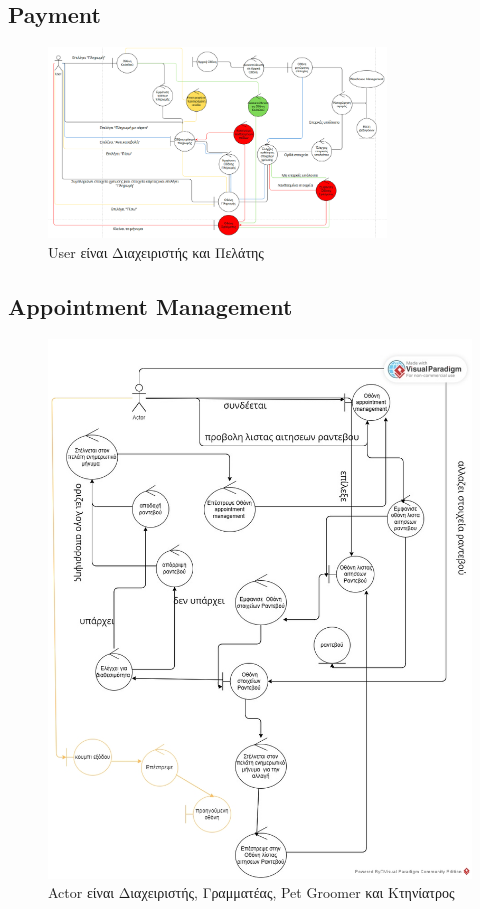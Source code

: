 \documentclass[12pt,a4paper,twoside]{book}
\begin{document}
\subsection{Payment}
\begin{figure}[H]
    \centering
    \includegraphics[width=0.8\textwidth]{Resources/Robustness Diagram/Payment.png}
    \caption{User είναι Διαχειριστής και Πελάτης}\label{fig:robustness-payment}
\end{figure}

\subsection{Appointment Management}
\begin{figure}[H]
    \centering
    \includegraphics[width=\textwidth]{Resources/Robustness Diagram/appointment-management.jpg}
    \caption{Actor είναι Διαχειριστής, Γραμματέας, Pet Groomer και Κτηνίατρος}\label{fig:robustness-appointment-management}
\end{figure}
\end{document}

